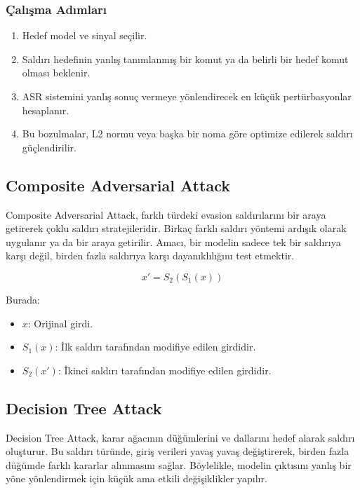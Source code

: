 \subsubsection{Çalışma Adımları}

\begin{enumerate}
    \item Hedef model ve sinyal seçilir.
    \item Saldırı hedefinin yanlış tanımlanmış bir komut ya da belirli bir hedef komut olması beklenir.
    \item ASR sistemini yanlış sonuç vermeye yönlendirecek en küçük pertürbasyonlar hesaplanır.
    \item Bu bozulmalar, L2 normu veya başka bir noma göre optimize edilerek saldırı güçlendirilir.
\end{enumerate}

\newpage

\subsection{Composite Adversarial Attack}

Composite Adversarial Attack, farklı türdeki evasion saldırılarını bir araya getirerek çoklu saldırı stratejileridir. Birkaç farklı saldırı yöntemi ardışık olarak uygulanır ya da bir araya getirilir. Amacı, bir modelin sadece tek bir saldırıya karşı değil, birden fazla saldırıya karşı dayanıklılığını test etmektir. 

\[ x' = S_2(S_1(x)) \]

Burada:

\begin{itemize}
    \item $x$: Orijinal girdi.
    \item $S_1(x)$: İlk saldırı tarafından modifiye edilen girdidir.
    \item $S_2(x')$: İkinci saldırı tarafından modifiye edilen girdidir.
\end{itemize}

\newpage

\subsection{Decision Tree Attack}

Decision Tree Attack, karar ağacının düğümlerini ve dallarını hedef alarak saldırı oluşturur. Bu saldırı türünde, giriş verileri yavaş yavaş değiştirerek, birden fazla düğümde farklı kararlar alınmasını sağlar. Böylelikle, modelin çıktısını yanlış bir yöne yönlendirmek için küçük ama etkili değişiklikler yapılır.

